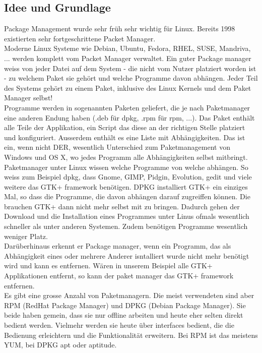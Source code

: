 \documentclass[10pt,paper=a4,final]{scrartcl}
\begin{document}
\subsection{Idee und Grundlage}
Package Management wurde sehr fr\"uh sehr wichtig f\"ur Linux. Bereits 1998 existierten sehr fortgeschrittene Packet Manager.\\
Moderne Linux Systeme wie Debian, Ubuntu, Fedora, RHEL, SUSE, Mandriva, ... werden komplett vom Packet Manager verwaltet. Ein guter Package manager weiss von jeder Datei auf dem System - die nicht vom Nutzer platziert worden ist - zu welchem Paket sie geh\"ort und welche Programme davon abh\"angen. Jeder Teil des Systems geh\"ort zu einem Paket, inklusive des Linux Kernels und dem Paket Manager selbst!\\
Programme werden in sogenannten Paketen geliefert, die je nach Paketmanager eine anderen Endung haben (.deb f\"ur dpkg, .rpm f\"ur rpm, ...). Das Paket enth\"alt alle Teile der Applikation, ein Script das diese an der richtigen Stelle platziert und konfiguriert. Ausserdem enth\"alt es eine Liste mit Abh\"angigkeiten. Das ist ein, wenn nicht DER, wesentlich Unterschied zum Paketmanagement von Windows und OS X, wo jedes Programm alle Abh\"angigkeiten selbst mitbringt.\\
Paketmanager unter Linux wissen welche Programme von welche abh\"angen. So weiss zum Beispiel dpkg, dass Gnome, GIMP, Pidgin, Evolution, gedit und viele weitere das GTK+ framework ben\"otigen. DPKG installiert GTK+ ein einziges Mal, so dass die Programme, die davon abh\"angen darauf zugreiffen k\"onnen. Die brauchen GTK+ dann nicht mehr selbst mit zu bringen. Dadurch gehen der Download und die Installation eines Programmes unter Linus ofmals wesentlich schneller als unter anderen Systemen. Zudem ben\"otigen Programme wesentlich weniger Platz.\\
Dar\"uberhinaus erkennt er Package manager, wenn ein Programm, das als Abh\"angigkeit eines oder mehrere Anderer isntalliert wurde nicht mehr ben\"otigt wird und kann es entfernen. W\"aren in unserem Beispiel alle GTK+ Applikationen entfernt, so kann der paket manager das GTK+ framework entfernen.\\
Es gibt eine grosse Anzahl von Paketmanagern. Die meist verwendeten sind aber RPM (RedHat Package Manager) und DPKG (Debian Package Manager). Sie beide haben gemein, dass sie nur offline arbeiten und heute eher selten direkt bedient werden. Vielmehr werden sie heute \"uber interfaces bedient, die die Bedienung erleichtern und die Funktionalit\"at erweitern. Bei RPM ist das meistens YUM, bei DPKG apt oder aptitude.\\
\end{document}
